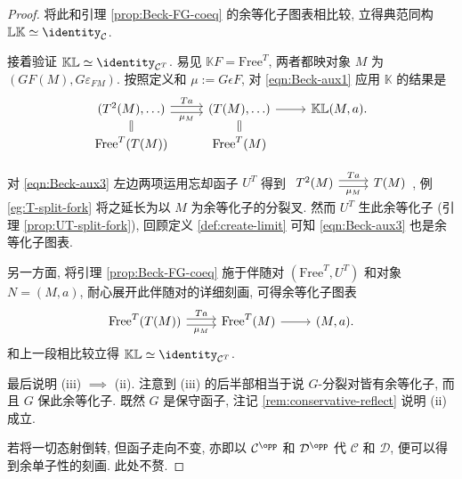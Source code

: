 \begin{proof}
	将此和引理 \ref{prop:Beck-FG-coeq} 的余等化子图表相比较, 立得典范同构 $\mathbb{L}\mathbb{K} \simeq \identity_{\mathcal{C}}$.
	
	接着验证 $\mathbb{K}\mathbb{L} \simeq \identity_{\mathcal{C}^T}$. 易见 $\mathbb{K}F = \mathrm{Free}^T$, 两者都映对象 $M$ 为 $(GF(M), G\varepsilon_{FM})$. 按照定义和 $\mu := G\epsilon F$, 对 \eqref{eqn:Beck-aux1} 应用 $\mathbb{K}$ 的结果是
	\begin{equation}\label{eqn:Beck-aux3}
		\begin{tikzcd}[row sep=small]
			(T^2(M), \ldots) \arrow[shift left, r, "Ta"] \arrow[shift right, r, "\mu_M"'] & (T(M), \ldots) \arrow[r] & \mathbb{K}\mathbb{L}(M, a). \\
			\mathrm{Free}^T(T(M)) \arrow[equal, u] & \mathrm{Free}^T(M) \arrow[equal, u] &
		\end{tikzcd}
	\end{equation}

	对 \eqref{eqn:Beck-aux3} 左边两项运用忘却函子 $U^T$ 得到
	$\begin{tikzcd}
		T^2(M) \arrow[shift left, r, "{Ta}"] \arrow[shift right, r, "{\mu_M}"'] & T(M)
	\end{tikzcd}$,
	例 \ref{eg:T-split-fork} 将之延长为以 $M$ 为余等化子的分裂叉. 然而 $U^T$ 生此余等化子 (引理 \ref{prop:UT-split-fork}), 回顾定义 \ref{def:create-limit} 可知 \eqref{eqn:Beck-aux3} 也是余等化子图表.
	
	另一方面, 将引理 \ref{prop:Beck-FG-coeq} 施于伴随对 $(\mathrm{Free}^T, U^T)$ 和对象 $N = (M, a)$, 耐心展开此伴随对的详细刻画, 可得余等化子图表
	\[\begin{tikzcd}[row sep=tiny]
		\mathrm{Free}^T(T(M)) \arrow[shift left, r, "Ta"] \arrow[shift right, r, "\mu_M"'] & \mathrm{Free}^T(M) \arrow[r] & (M, a).
	\end{tikzcd}\]
	和上一段相比较立得 $\mathbb{K}\mathbb{L} \simeq \identity_{\mathcal{C}^T}$.
	
	最后说明 (iii) $\implies$ (ii). 注意到 (iii) 的后半部相当于说 $G$-分裂对皆有余等化子, 而且 $G$ 保此余等化子. 既然 $G$ 是保守函子, 注记 \ref{rem:conservative-reflect} 说明 (ii) 成立.
	
	若将一切态射倒转, 但函子走向不变, 亦即以 $\mathcal{C}^{\opp}$ 和 $\mathcal{D}^{\opp}$ 代 $\mathcal{C}$ 和 $\mathcal{D}$, 便可以得到余单子性的刻画. 此处不赘.
\end{proof}
